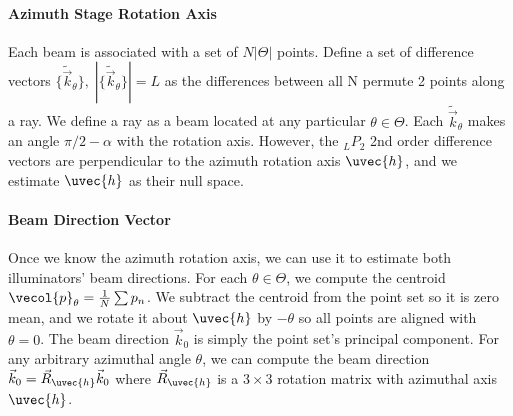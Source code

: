 \paragraph{Azimuth Stage Rotation Axis}
Each beam is associated with a set of $N|\Theta|$ points. Define a set of difference vectors $\{\tilde{\vec{k}}_\theta\}, \; |\{\tilde{\vec{k}}_\theta\}| = L$ as the differences between all N permute 2 points along a ray. We define a ray as a beam located at any particular $\theta \in \Theta$. Each $\tilde{\vec{k}}_\theta$ makes an angle $\pi/2 - \alpha$ with the rotation axis. However, the $_L P_2$ 2nd order difference vectors are perpendicular to the azimuth rotation axis $\uvec{h}$, and we estimate $\uvec{h}$ as their null space.

\paragraph{Beam Direction Vector}
Once we know the azimuth rotation axis, we can use it to estimate both illuminators' beam directions. For each $\theta \in \Theta$, we compute the centroid $\vecol{p}_\theta = \frac{1}{N} \sum p_n$. We subtract the centroid from the point set so it is zero mean, and we rotate it about $\uvec{h}$ by $-\theta$ so all points are aligned with $\theta = 0$. The beam direction $\vec{k}_0$ is simply the point set's principal component. For any arbitrary azimuthal angle $\theta$, we can compute the beam direction $\vec{k}_0 = \vec{R}_{\uvec{h}} \vec{k}_0$ where $\vec{R}_{\uvec{h}}$ is a $3 \times 3$ rotation matrix with azimuthal axis $\uvec{h}$.


